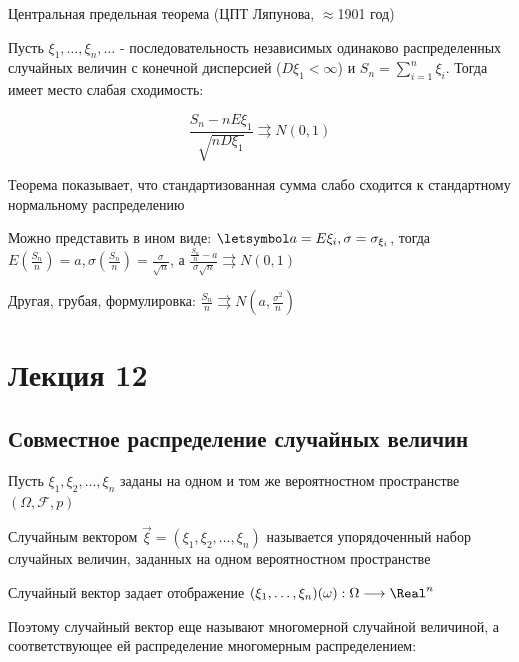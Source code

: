 \documentclass[12pt]{article}
\begin{document}
    \hypertarget{centrallimittheorem}{}

    \begin{MyTheorem}
        \Ths Центральная предельная теорема (ЦПТ Ляпунова, $\approx$1901 год)

        Пусть $\xi_1, \dots, \xi_n, \dots$ - последовательность независимых одинаково распределенных случайных величин
        с конечной дисперсией ($D\xi_1 < \infty$) и $S_n = \sum_{i = 1}^n \xi_i$. Тогда имеет место слабая сходимость:

        \[\frac{S_n - nE\xi_1}{\sqrt{nD\xi_1}} \rightrightarrows N(0, 1)\]
    \end{MyTheorem}

    Теорема показывает, что стандартизованная сумма слабо сходится к стандартному нормальному распределению

    \Nota Можно представить в ином виде: $\letsymbol a = E\xi_i, \sigma = \sigma_{\xi_i}$, тогда $E\left(\frac{S_n}{n}\right) = a, \sigma\left(\frac{S_n}{n}\right) = \frac{\sigma}{\sqrt{n}}$, а $\frac{\frac{S_n}{n} - a}{\sigma \sqrt{n}} \rightrightarrows N(0, 1)$

    \Nota Другая, грубая, формулировка: $\frac{S_n}{n} \rightrightarrows N\left(a, \frac{\sigma^2}{n}\right)$


    \section{Лекция 12}

    \hypertarget{jointdistribution}{}

    \subsection{Совместное распределение случайных величин}

    Пусть $\xi_1, \xi_2, \dots, \xi_n$ заданы на одном и том же вероятностном пространстве $(\Omega, \mathcal{F}, p)$

    \Def Случайным вектором $\vec{\xi} = (\xi_1, \xi_2, \dots, \xi_n)$ называется упорядоченный набор случайных величин, заданных
    на одном вероятностном пространстве

    Случайный вектор задает отображение $(\xi_1, \dots, \xi_n) (\omega) : \Omega \longrightarrow \Real^n$

    Поэтому случайный вектор еще называют многомерной случайной величиной, 
    а соответствующее ей распределение многомерным распределением: 
\end{document}

